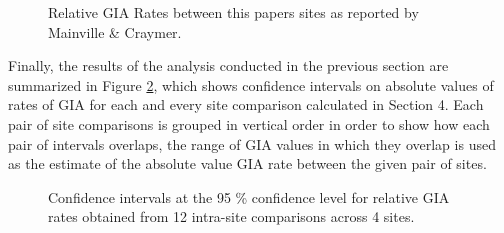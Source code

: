 \begin{figure}[h]
	\caption{Relative GIA Rates between this papers sites as reported by Mainville \& Craymer.}
	\label{fig:craymerGIARates}
\end{figure}
\newpage



Finally, the results of the analysis conducted in the previous section are summarized in
Figure \ref{fig:intervalsGIA}, which shows confidence intervals on absolute values of
rates of GIA for each and every site comparison calculated in Section 4. Each
pair of site comparisons is grouped in vertical order in order to show how each pair
of intervals overlaps, the range of GIA values in which they overlap is used as
the estimate of the absolute value GIA rate between the given pair of sites.

\newpage

\begin{figure}[H]
	\caption{Confidence intervals at the 95 \% confidence level for relative GIA rates obtained from 12 intra-site comparisons across 4 sites.}
	\label{fig:intervalsGIA}
\end{figure}

